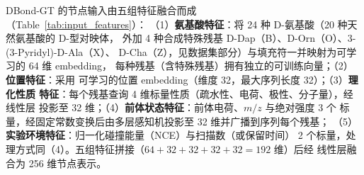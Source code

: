 %
%
%
%

DBond-GT 的节点输入由五组特征融合而成（Table~\ref{tab:input_features}）：
（1）\textbf{氨基酸特征}：将 24 种 D-氨基酸（20 种天然氨基酸的 D-型对映体，
外加 4 种合成特殊残基 D-Dap（B）、D-Orn（O）、3-(3-Pyridyl)-D-Ala（X）、
D-Cha（Z），见数据集部分）与填充符一并映射为可学习的 64 维 embedding，
每种残基（含特殊残基）拥有独立的可训练向量；（2）\textbf{位置特征}：采用
可学习的位置 embedding（维度 32，最大序列长度 32）；（3）\textbf{理化性质
特征}：每个残基查询 4 维标量性质（疏水性、电荷、极性、分子量），经线性层
投影至 32 维；（4）\textbf{前体状态特征}：前体电荷、$m/z$ 与绝对强度 3 个
标量，经固定常数变换后由多层感知机投影至 32 维并广播到序列每个残基；
（5）\textbf{实验环境特征}：归一化碰撞能量（NCE）与扫描数（或保留时间）
2 个标量，处理方式同（4）。五组特征拼接（$64+32+32+32+32=192$ 维）后经
线性层融合为 256 维节点表示。

